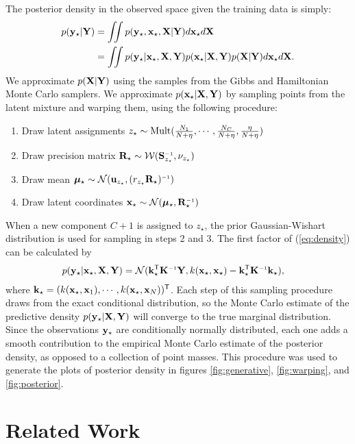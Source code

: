The posterior density in the observed space given the training data is simply:
\begin{align}
p({\bf{y}}_\star | \mathbf{Y})
& = \int \!\!\! \int p({\bf{y}}_\star,{\bf{x}}_\star, \mathbf{X} | \mathbf{Y})d{\bf{x}}_\star d\mathbf{X} \nonumber\\
& = \int\!\!\! \int p({\bf{y}}_\star | {\bf{x}}_\star, \mathbf{X}, \mathbf{Y})p({\bf{x}}_\star|\mathbf{X},\mathbf{Y})p(\mathbf{X}|\mathbf{Y})d{\bf{x}}_\star d\mathbf{X}.
\label{eq:density}
\end{align}
We approximate $p(\mathbf{X} | \mathbf{Y})$ using the samples from the Gibbs and Hamiltonian Monte Carlo samplers.
We approximate $p({\bf{x}}_\star | \mathbf{X}, \mathbf{Y})$ by sampling points from the latent mixture and warping them, using the following procedure:
\begin{enumerate}
\item Draw latent assignments
$z_\star \sim {\rm Mult}(\frac{N_{1}}{N+\eta},\cdots,\frac{N_{C}}{N+\eta},\frac{\eta}{N+\eta})$
\item Draw precision matrix
$\vR_\star \sim {\cal W}(\vS\inv_{z_\star},\nu_{z_\star})$
\item Draw mean
$\vmu_\star \sim {\cal N}(\vu_{z_\star},(r_{z_\star}\vR_\star)\inv)$
\item Draw latent coordinates
$\vx_\star \sim {\cal N}(\vmu_\star,\vR_\star\inv)$
\end{enumerate}
%
When a new component $C+1$ is assigned to $z_\star$, the prior Gaussian-Wishart distribution is used for sampling in steps 2 and 3.
The first factor of (\ref{eq:density}) can be calculated by
%
\begin{align}
p(\vy_\star | \vx_\star, \vX, \vY)
& = {\cal N}(\vk_\star\tra \vK\inv \vY, k(\vx_\star,\vx_\star)-\vk_\star\tra \vK\inv \vk_\star),
\end{align}
%
where
%
${\bf{k}}_\star=( k({\bf{x}}_\star, {\bf{x}}_1), \cdots, k({\bf{x}}_\star, {\bf{x}}_N))^{\mathsf{T}}$.
%  
Each step of this sampling procedure draws from the exact conditional distribution, so the Monte Carlo estimate of the predictive density $p({\bf{y}}_\star | \mathbf{X}, \mathbf{Y})$ will converge to the true marginal distribution.
Since the observations ${\bf{y}}_\star$ are conditionally normally distributed, each one adds a smooth contribution to the empirical Monte Carlo estimate of the posterior density, as opposed to a collection of point masses.
This procedure was used to generate the plots of posterior density in figures \ref{fig:generative}, \ref{fig:warping}, and \ref{fig:posterior}.





\section{Related Work}

